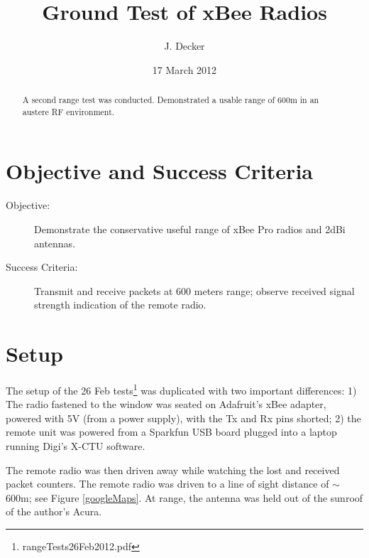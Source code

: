 \documentclass[11pt,letterpaper]{article}
\author{J. Decker}
\date{17 March 2012}
\title{Ground Test of xBee Radios}
\begin{document}
\maketitle
\begin{abstract}
A second range test was conducted.  Demonstrated a usable range of 600m in an austere RF environment.
\end{abstract}

\section{Objective and Success Criteria}
\begin{description}
\item[Objective:] Demonstrate the conservative useful range of xBee Pro radios and 2dBi antennas.
\item[Success Criteria:] Transmit and receive packets at 600 meters range; observe received signal strength indication of the remote radio.
\end{description}

\section{Setup}

The setup of the 26 Feb tests\footnote{rangeTests26Feb2012.pdf} was duplicated with two important differences: 1) The radio fastened to the window was seated on Adafruit's xBee adapter, powered with 5V (from a power supply), with the Tx and Rx pins shorted; 2) the remote unit was powered from a Sparkfun USB board plugged into a laptop running Digi's X-CTU software.

The remote radio was then driven away while watching the lost and received packet counters.  The remote radio was driven to a line of sight distance of $\sim$600m; see Figure \ref{googleMaps}.  At range, the antenna was held out of the sunroof of the author's Acura. 
\end{document}
